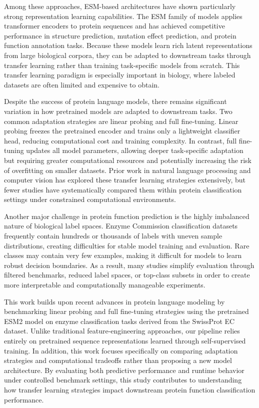 \documentclass{article}
\begin{document}
Among these approaches, ESM-based architectures have shown particularly strong representation learning capabilities. The ESM family of models applies transformer encoders to protein sequences and has achieved competitive performance in structure prediction, mutation effect prediction, and protein function annotation tasks. Because these models learn rich latent representations from large biological corpora, they can be adapted to downstream tasks through transfer learning rather than training task-specific models from scratch. This transfer learning paradigm is especially important in biology, where labeled datasets are often limited and expensive to obtain.

Despite the success of protein language models, there remains significant variation in how pretrained models are adapted to downstream tasks. Two common adaptation strategies are linear probing and full fine-tuning. Linear probing freezes the pretrained encoder and trains only a lightweight classifier head, reducing computational cost and training complexity. In contrast, full fine-tuning updates all model parameters, allowing deeper task-specific adaptation but requiring greater computational resources and potentially increasing the risk of overfitting on smaller datasets. Prior work in natural language processing and computer vision has explored these transfer learning strategies extensively, but fewer studies have systematically compared them within protein classification settings under constrained computational environments.

Another major challenge in protein function prediction is the highly imbalanced nature of biological label spaces. Enzyme Commission classification datasets frequently contain hundreds or thousands of labels with uneven sample distributions, creating difficulties for stable model training and evaluation. Rare classes may contain very few examples, making it difficult for models to learn robust decision boundaries. As a result, many studies simplify evaluation through filtered benchmarks, reduced label spaces, or top-class subsets in order to create more interpretable and computationally manageable experiments.

This work builds upon recent advances in protein language modeling by benchmarking linear probing and full fine-tuning strategies using the pretrained ESM2 model on enzyme classification tasks derived from the SwissProt EC dataset. Unlike traditional feature-engineering approaches, our pipeline relies entirely on pretrained sequence representations learned through self-supervised training. In addition, this work focuses specifically on comparing adaptation strategies and computational tradeoffs rather than proposing a new model architecture. By evaluating both predictive performance and runtime behavior under controlled benchmark settings, this study contributes to understanding how transfer learning strategies impact downstream protein function classification performance.
\end{document}

